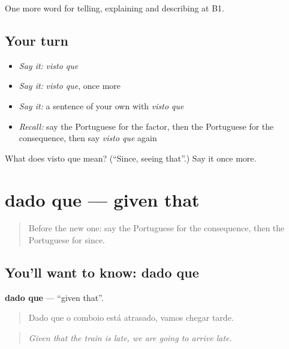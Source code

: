 \begin{grammarlens}[title={What you've built}]
One more word for telling, explaining and describing at B1.
\end{grammarlens}

\subsection*{Your turn}
\begin{itemize}
\raggedright
  \item \emph{Say it:} \emph{visto que}
  \item \emph{Say it:} \emph{visto que}, once more
  \item \emph{Say it:} a sentence of your own with \emph{visto que}
  \item \emph{Recall:} say the Portuguese for the factor, then the Portuguese for the consequence, then say \emph{visto que} again
\end{itemize}

\begin{tcolorbox}[breakable,colback=teal!4,colframe=teal!35!black,title={Before you move on}]
What does visto que mean? (\textquotedblleft{}Since, seeing that\textquotedblright{}.) Say it once more.
\end{tcolorbox}
\section[dado que]{dado que — given that}

\label{lesson:PT-C349-dado-que}



\begin{quote}
Before the new one: say the Portuguese for the consequence, then the Portuguese for since.
\end{quote}

\subsection*{You'll want to know: dado que}
\textbf{dado que} — \textquotedblleft{}given that\textquotedblright{}.

\begin{quote}
Dado que o comboio está atrasado, vamos chegar tarde.
\end{quote}

\begin{quote}
\emph{Given that the train is late, we are going to arrive late.}
\end{quote}

